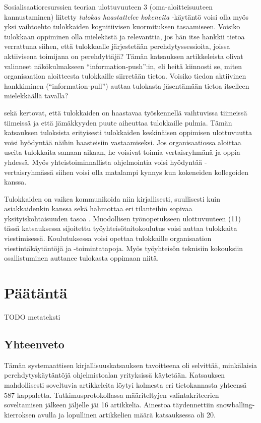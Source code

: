 \documentclass[utf8]{gradu3}
\begin{document}
Sosialisaatioresurssien teorian ulottuvuuteen 3 (oma-aloitteisuuteen kannustaminen) liitetty \textit{tulokas haastattelee kokeneita} -käytäntö voisi olla myös yksi vaihtoehto tulokkaiden kognitiivisen kuormituksen tasaamiseen. Voisiko tulokkaan oppiminen olla mielekästä ja relevanttia, jos hän itse hankkii tietoa verrattuna siihen, että tulokkaalle järjestetään perehdytyssessioita, joissa aktiivisena toimijana on perehdyttäjä? Tämän katsauksen artikkeleista \textcite{yates-ym-2020} olivat valinneet näkökulmakseen ``information-push'':in, eli heitä kiinnosti se, miten organisaation aloitteesta tulokkaille siirretään tietoa. Voisiko tiedon aktiivinen hankkiminen (``information-pull'') auttaa tulokasta jäsentämään tietoa itselleen mielekkäällä tavalla?

\textcite{britto-ym-2019} sekä \textcite{begel-simon-2008} kertovat, että tulokkaiden on haastavaa työskennellä vaihtuvissa tiimeissä tiimeissä ja että jämäkkyyden puute aiheuttaa tulokkaille pulmia. Tämän katsauksen tuloksista erityisesti tulokkaiden keskinäisen oppimisen ulottuvuutta voisi hyödyntää näihin haasteisiin vastaamiseksi. Jos organisaatiossa aloittaa useita tulokkaita samaan aikaan, he voisivat toimia vertaisryhmänä ja oppia yhdessä. Myös yhteistoiminnallista ohjelmointia voisi hyödyntää - vertaisryhmässä siihen voisi olla matalampi kynnys kun kokeneiden kollegoiden kanssa. 

Tulokkaiden on vaikea kommunikoida niin kirjallisesti, suullisesti kuin asiakkaidenkin kanssa sekä hahmottaa eri tilanteihin sopivaa yksityiskohtaisuuden tasoa %
\parencites%
    {radermacher-ym-2015}%
    {begel-simon-2008}%
\relax.
%
Muodollisen työnopetukseen ulottuvuuteen (11) tässä katsauksessa sijoitettu työyhteisötaitokoulutus voisi auttaa tulokkaita viestimisessä. Koulutuksessa voisi opettaa tulokkaille organisaation viestintäkäytäntöjä ja -toimintatapoja. Myös työyhteisön teknisiin kokouksiin osallistuminen auttanee tulokasta oppimaan niitä.

\chapter{Päätäntä}
\label{paaluku-paatanta}

TODO metateksti

\section{Yhteenveto}

Tämän systemaattisen kirjallisuuskatsauksen tavoitteena oli selvittää, minkälaisia perehdytyskäytäntöjä ohjelmistoalan yrityksissä käytetään. Katsauksen mahdollisesti soveltuvia artikkeleita löytyi kolmesta eri tietokannasta yhteensä 587 kappaletta. Tutkimusprotokollassa määriteltyjen valintakriteerien soveltamisen jälkeen jäljelle jäi 16 artikkelia. Ainestoa täydennettiin snowballing-kierroksen avulla ja lopullinen artikkelien määrä katsauksessa oli 20.
\end{document}
